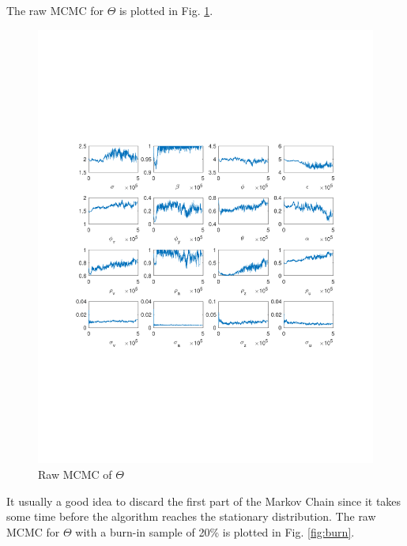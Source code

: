 \documentclass[12pt]{article}
\theoremstyle{definition}
\begin{document}
The raw MCMC for $\Theta$ is plotted in Fig. \ref{fig:raw}.

\begin{figure}[H]
	\centering
	\includegraphics[width=\linewidth]{raw_MCMC}
	\caption{Raw MCMC of $\Theta$}
	\label{fig:raw}
\end{figure}

It usually a good idea to discard the first part of the Markov Chain since it takes some time before the algorithm reaches the stationary distribution. The raw MCMC for $\Theta$ with a burn-in sample of 20\% is plotted in Fig. \ref{fig:burn}.
\end{document}
